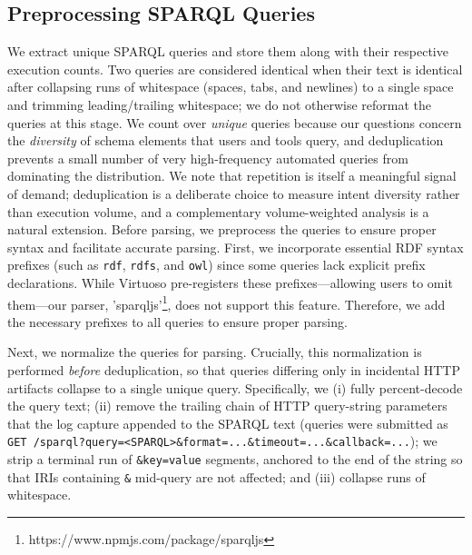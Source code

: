 \documentclass[sw]{iosart2x}
\begin{document}
\subsection{Preprocessing SPARQL Queries}

We extract unique SPARQL queries and store them along with their respective execution counts. Two queries are considered identical when their text is identical after collapsing runs of whitespace (spaces, tabs, and newlines) to a single space and trimming leading/trailing whitespace; we do not otherwise reformat the queries at this stage. We count over \emph{unique} queries because our questions concern the \emph{diversity} of schema elements that users and tools query, and deduplication prevents a small number of very high-frequency automated queries from dominating the distribution. We note that repetition is itself a meaningful signal of demand; deduplication is a deliberate choice to measure intent diversity rather than execution volume, and a complementary volume-weighted analysis is a natural extension. Before parsing, we preprocess the queries to ensure proper syntax and facilitate accurate parsing. First, we incorporate essential RDF syntax prefixes (such as \texttt{rdf}, \texttt{rdfs}, and \texttt{owl}) since some queries lack explicit prefix declarations. While Virtuoso pre-registers these prefixes—allowing users to omit them—our parser, 'sparqljs'\footnote{https://www.npmjs.com/package/sparqljs}, does not support this feature. Therefore, we add the necessary prefixes to all queries to ensure proper parsing.

Next, we normalize the queries for parsing. Crucially, this normalization is performed \emph{before} deduplication, so that queries differing only in incidental HTTP artifacts collapse to a single unique query. Specifically, we (i) fully percent-decode the query text; (ii) remove the trailing chain of HTTP query-string parameters that the log capture appended to the SPARQL text (queries were submitted as \texttt{GET /sparql?query=<SPARQL>\&format=...\&timeout=...\&callback=...}); we strip a terminal run of \texttt{\&key=value} segments, anchored to the end of the string so that IRIs containing \texttt{\&} mid-query are not affected; and (iii) collapse runs of whitespace.
\end{document}
